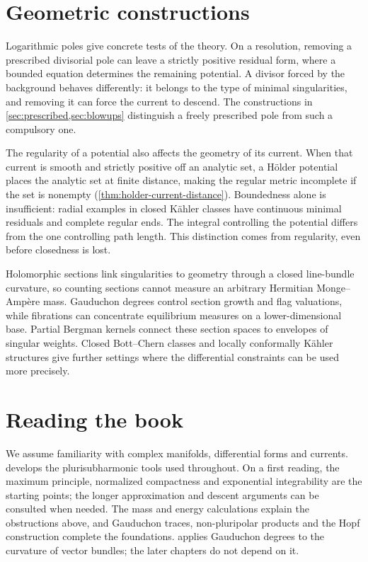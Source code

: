 \section*{Geometric constructions}

Logarithmic poles give concrete tests of the theory. On a resolution, removing a prescribed divisorial pole can leave a strictly positive residual form, where a bounded equation determines the remaining potential. A divisor forced by the background behaves differently: it belongs to the type of minimal singularities, and removing it can force the current to descend. The constructions in \cref{sec:prescribed,sec:blowups} distinguish a freely prescribed pole from such a compulsory one.

The regularity of a potential also affects the geometry of its current. When that current is smooth and strictly positive off an analytic set, a H\"older potential places the analytic set at finite distance, making the regular metric incomplete if the set is nonempty (\cref{thm:holder-current-distance}). Boundedness alone is insufficient: radial examples in closed K\"ahler classes have continuous minimal residuals and complete regular ends. The integral controlling the potential differs from the one controlling path length. This distinction comes from regularity, even before closedness is lost.

Holomorphic sections link singularities to geometry through a closed line-bundle curvature, so counting sections cannot measure an arbitrary Hermitian Monge--Amp\`ere mass. Gauduchon degrees control section growth and flag valuations, while fibrations can concentrate equilibrium measures on a lower-dimensional base. Partial Bergman kernels connect these section spaces to envelopes of singular weights. Closed Bott--Chern classes and locally conformally K\"ahler structures give further settings where the differential constraints can be used more precisely.

\section*{Reading the book}

We assume familiarity with complex manifolds, differential forms and currents.  develops the plurisubharmonic tools used throughout. On a first reading, the maximum principle, normalized compactness and exponential integrability are the starting points; the longer approximation and descent arguments can be consulted when needed. The mass and energy calculations explain the obstructions above, and Gauduchon traces, non-pluripolar products and the Hopf construction complete the foundations.  applies Gauduchon degrees to the curvature of vector bundles; the later chapters do not depend on it.

